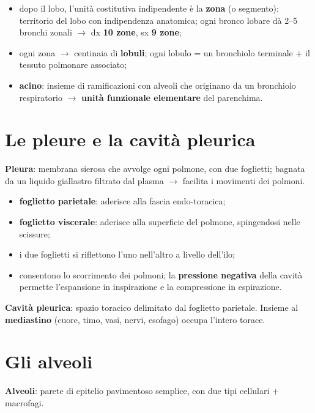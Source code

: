 \begin{itemize}
  \item dopo il lobo, l'unità costitutiva indipendente è la \textbf{zona} (o segmento): territorio
    del lobo con indipendenza anatomica; ogni bronco lobare dà 2--5 bronchi zonali $\rightarrow$
    dx \textbf{10 zone}, sx \textbf{9 zone};
  \item ogni zona $\rightarrow$ centinaia di \textbf{lobuli}; ogni lobulo = un bronchiolo terminale +
    il tessuto polmonare associato;
  \item \textbf{acino}: insieme di ramificazioni con alveoli che originano da un bronchiolo
    respiratorio $\rightarrow$ \textbf{unità funzionale elementare} del parenchima.
\end{itemize}

\section{Le pleure e la cavità pleurica}

\textbf{Pleura}: membrana sierosa che avvolge ogni polmone, con due foglietti; bagnata da un liquido
giallastro filtrato dal plasma $\rightarrow$ facilita i movimenti dei polmoni.
\begin{itemize}
  \item \textbf{foglietto parietale}: aderisce alla fascia endo-toracica;
  \item \textbf{foglietto viscerale}: aderisce alla superficie del polmone, spingendosi nelle
    scissure;
  \item i due foglietti si riflettono l'uno nell'altro a livello dell'ilo;
  \item consentono lo scorrimento dei polmoni; la \textbf{pressione negativa} della cavità permette
    l'espansione in inspirazione e la compressione in espirazione.
\end{itemize}

\textbf{Cavità pleurica}: spazio toracico delimitato dal foglietto parietale. Insieme al
\textbf{mediastino} (cuore, timo, vasi, nervi, esofago) occupa l'intero torace.

\section{Gli alveoli}

\textbf{Alveoli}: parete di epitelio pavimentoso semplice, con due tipi cellulari + macrofagi.

